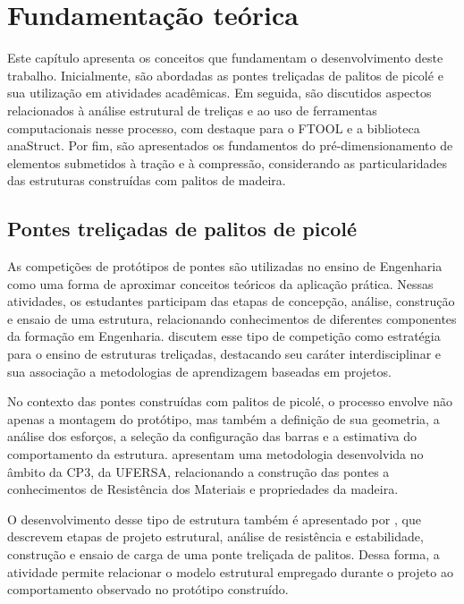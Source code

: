 \chapter{Fundamentação teórica}
\label{cap:fundamentacao-teorica}

Este capítulo apresenta os conceitos que fundamentam o desenvolvimento deste trabalho. Inicialmente, são abordadas as pontes treliçadas de palitos de picolé e sua utilização em atividades acadêmicas. Em seguida, são discutidos aspectos relacionados à análise estrutural de treliças e ao uso de ferramentas computacionais nesse processo, com destaque para o \gls{FTOOL} e a biblioteca anaStruct. Por fim, são apresentados os fundamentos do pré-dimensionamento de elementos submetidos à tração e à compressão, considerando as particularidades das estruturas construídas com palitos de madeira.

\section{Pontes treliçadas de palitos de picolé}
\label{sec:pontes-trelicadas-palitos}

As competições de protótipos de pontes são utilizadas no ensino de Engenharia como uma forma de aproximar conceitos teóricos da aplicação prática. Nessas atividades, os estudantes participam das etapas de concepção, análise, construção e ensaio de uma estrutura, relacionando conhecimentos de diferentes componentes da formação em Engenharia.  discutem esse tipo de competição como estratégia para o ensino de estruturas treliçadas, destacando seu caráter interdisciplinar e sua associação a metodologias de aprendizagem baseadas em projetos.

No contexto das pontes construídas com palitos de picolé, o processo envolve não apenas a montagem do protótipo, mas também a definição de sua geometria, a análise dos esforços, a seleção da configuração das barras e a estimativa do comportamento da estrutura.  apresentam uma metodologia desenvolvida no âmbito da \gls{CP3}, da \gls{UFERSA}, relacionando a construção das pontes a conhecimentos de Resistência dos Materiais e propriedades da madeira.

O desenvolvimento desse tipo de estrutura também é apresentado por , que descrevem etapas de projeto estrutural, análise de resistência e estabilidade, construção e ensaio de carga de uma ponte treliçada de palitos. Dessa forma, a atividade permite relacionar o modelo estrutural empregado durante o projeto ao comportamento observado no protótipo construído.

